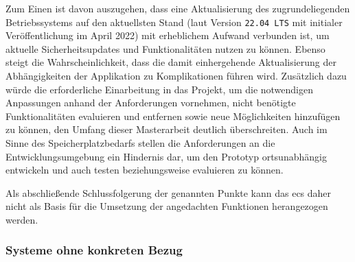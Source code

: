 \documentclass[a4paper,12pt,twoside]{scrreprt}
\begin{document}
Zum Einen ist davon auszugehen, dass eine Aktualisierung des zugrundeliegenden Betriebssystems auf den aktuellsten Stand (laut \cite{canonical_ltd_ubuntu_2023-1} Version \texttt{22.04 LTS} mit initialer Veröffentlichung im April 2022) mit erheblichem Aufwand verbunden ist, um aktuelle Sicherheitsupdates und Funktionalitäten nutzen zu können. Ebenso steigt die Wahrscheinlichkeit, dass die damit einhergehende Aktualisierung der Abhängigkeiten der Applikation zu Komplikationen führen wird. Zusätzlich dazu würde die erforderliche Einarbeitung in das Projekt, um die notwendigen Anpassungen anhand der Anforderungen vornehmen, nicht benötigte Funktionalitäten evaluieren und entfernen sowie neue Möglichkeiten hinzufügen zu können, den Umfang dieser Masterarbeit deutlich überschreiten. Auch im Sinne des Speicherplatzbedarfs stellen die Anforderungen an die Entwicklungsumgebung ein Hindernis dar, um den Prototyp ortsunabhängig entwickeln und auch testen beziehungsweise evaluieren zu können.

Als abschließende Schlussfolgerung der genannten Punkte kann das \ac{ecs} daher nicht als Basis für die Umsetzung der angedachten Funktionen herangezogen werden.

\subsubsection*{Systeme ohne konkreten Bezug}
\label{sub-sub-sec:technische-basis-systeme-ohne-bezug}
\end{document}
